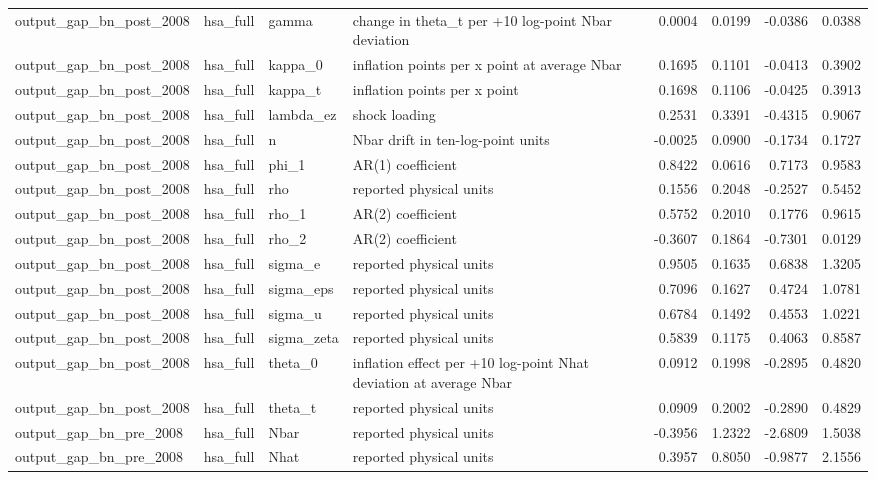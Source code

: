 \begin{tabular}{llllrrrr}
output\_gap\_bn\_post\_2008 & hsa\_full & gamma & change in theta\_t per +10 log-point Nbar deviation & 0.0004 & 0.0199 & -0.0386 & 0.0388 \\
output\_gap\_bn\_post\_2008 & hsa\_full & kappa\_0 & inflation points per x point at average Nbar & 0.1695 & 0.1101 & -0.0413 & 0.3902 \\
output\_gap\_bn\_post\_2008 & hsa\_full & kappa\_t & inflation points per x point & 0.1698 & 0.1106 & -0.0425 & 0.3913 \\
output\_gap\_bn\_post\_2008 & hsa\_full & lambda\_ez & shock loading & 0.2531 & 0.3391 & -0.4315 & 0.9067 \\
output\_gap\_bn\_post\_2008 & hsa\_full & n & Nbar drift in ten-log-point units & -0.0025 & 0.0900 & -0.1734 & 0.1727 \\
output\_gap\_bn\_post\_2008 & hsa\_full & phi\_1 & AR(1) coefficient & 0.8422 & 0.0616 & 0.7173 & 0.9583 \\
output\_gap\_bn\_post\_2008 & hsa\_full & rho & reported physical units & 0.1556 & 0.2048 & -0.2527 & 0.5452 \\
output\_gap\_bn\_post\_2008 & hsa\_full & rho\_1 & AR(2) coefficient & 0.5752 & 0.2010 & 0.1776 & 0.9615 \\
output\_gap\_bn\_post\_2008 & hsa\_full & rho\_2 & AR(2) coefficient & -0.3607 & 0.1864 & -0.7301 & 0.0129 \\
output\_gap\_bn\_post\_2008 & hsa\_full & sigma\_e & reported physical units & 0.9505 & 0.1635 & 0.6838 & 1.3205 \\
output\_gap\_bn\_post\_2008 & hsa\_full & sigma\_eps & reported physical units & 0.7096 & 0.1627 & 0.4724 & 1.0781 \\
output\_gap\_bn\_post\_2008 & hsa\_full & sigma\_u & reported physical units & 0.6784 & 0.1492 & 0.4553 & 1.0221 \\
output\_gap\_bn\_post\_2008 & hsa\_full & sigma\_zeta & reported physical units & 0.5839 & 0.1175 & 0.4063 & 0.8587 \\
output\_gap\_bn\_post\_2008 & hsa\_full & theta\_0 & inflation effect per +10 log-point Nhat deviation at average Nbar & 0.0912 & 0.1998 & -0.2895 & 0.4820 \\
output\_gap\_bn\_post\_2008 & hsa\_full & theta\_t & reported physical units & 0.0909 & 0.2002 & -0.2890 & 0.4829 \\
output\_gap\_bn\_pre\_2008 & hsa\_full & Nbar & reported physical units & -0.3956 & 1.2322 & -2.6809 & 1.5038 \\
output\_gap\_bn\_pre\_2008 & hsa\_full & Nhat & reported physical units & 0.3957 & 0.8050 & -0.9877 & 2.1556 \\

\end{tabular}
